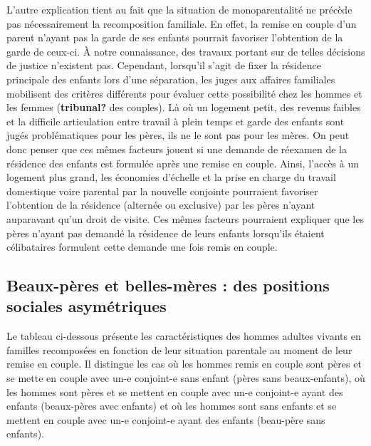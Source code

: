 \documentclass[
  12pt,
]{book}
\begin{document}
L'autre explication tient au fait que la situation de monoparentalité ne
précède pas nécessairement la recomposition familiale. En effet, la
remise en couple d'un parent n'ayant pas la garde de ses enfants
pourrait favoriser l'obtention de la garde de ceux-ci. À notre
connaissance, des travaux portant sur de telles décisions de justice
n'existent pas. Cependant, lorsqu'il s'agit de fixer la résidence
principale des enfants lors d'une séparation, les juges aux affaires
familiales mobilisent des critères différents pour évaluer cette
possibilité chez les hommes et les femmes (\textbf{tribunal?} des
couples). Là où un logement petit, des revenus faibles et la difficile
articulation entre travail à plein temps et garde des enfants sont jugés
problématiques pour les pères, ils ne le sont pas pour les mères. On
peut donc penser que ces mêmes facteurs jouent si une demande de
réexamen de la résidence des enfants est formulée après une remise en
couple. Ainsi, l'accès à un logement plus grand, les économies d'échelle
et la prise en charge du travail domestique voire parental par la
nouvelle conjointe pourraient favoriser l'obtention de la résidence
(alternée ou exclusive) par les pères n'ayant auparavant qu'un droit de
visite. Ces mêmes facteurs pourraient expliquer que les pères n'ayant
pas demandé la résidence de leurs enfants lorsqu'ils étaient
célibataires formulent cette demande une fois remis en couple.

\subsection{Beaux-pères et belles-mères : des positions sociales
asymétriques}\label{beaux-puxe8res-et-belles-muxe8res-des-positions-sociales-asymuxe9triques}

Le tableau ci-dessous présente les caractéristiques des hommes adultes
vivants en familles recomposées en fonction de leur situation parentale
au moment de leur remise en couple. Il distingue les cas où les hommes
remis en couple sont pères et se mette en couple avec un-e conjoint-e
sans enfant (pères sans beaux-enfants), où les hommes sont pères et se
mettent en couple avec un-e conjoint-e ayant des enfants (beaux-pères
avec enfants) et où les hommes sont sans enfants et se mettent en couple
avec un-e conjoint-e ayant des enfants (beau-père sans enfants).
\end{document}
